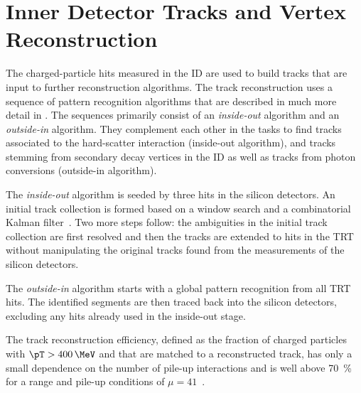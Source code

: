\section{Inner Detector Tracks and Vertex Reconstruction}
The charged-particle hits measured in the ID are used to build tracks that are input to further reconstruction algorithms.
The track reconstruction uses a sequence of pattern recognition algorithms that are described in much more detail in . The sequences primarily consist of an \emph{inside-out} algorithm and an \emph{outside-in} algorithm. They complement each other in the tasks to find tracks associated to the hard-scatter interaction (inside-out algorithm), and tracks stemming from secondary decay vertices in the ID as well as tracks from photon conversions (outside-in algorithm).

The \emph{inside-out} algorithm is seeded by three hits in the silicon detectors. An initial track collection is formed based on a window search and a combinatorial Kalman filter~\cite{fruhwirth_application_1987}. Two more steps follow: the ambiguities in the initial track collection are first resolved and then the tracks are extended to hits in the TRT without manipulating the original tracks found from the measurements of the silicon detectors.

The \emph{outside-in} algorithm starts with a global pattern recognition from all TRT hits. The identified segments are then traced back into the silicon detectors, excluding any hits already used in the inside-out stage.

The track reconstruction efficiency, defined as the fraction of charged particles with $\pT > 400\,\MeV$ and  that are matched to a reconstructed track, has only a small dependence on the number of pile-up interactions and is well above \SI{70}{\percent} for a range  and pile-up conditions of $\mu = 41$~\cite{ATLAS-CONF-2012-042}. 

